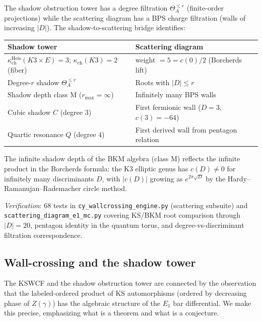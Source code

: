 \begin{remark}
\label{rem:k3e-degree-bps}
The shadow obstruction tower has a degree filtration $\Theta_A^{\leq r}$ (finite-order projections) while the scattering diagram has a BPS charge filtration (walls of increasing $|D|$). The shadow-to-scattering bridge identifies:
\begin{center}
\begin{tabular}{ll}
\textbf{Shadow tower} & \textbf{Scattering diagram} \\ \hline
$\kappa_{\mathrm{ch}}^{\mathrm{Heis}}(K3 \times E) = 3$; $\kappa_{\mathrm{ch}}(K3) = 2$ (fiber) & weight $= 5 = c(0)/2$ (Borcherds lift) \\
Degree-$r$ shadow $\Theta_A^{\leq r}$ & Roots with $|D| \leq r$ \\
Shadow depth class M ($r_{\max} = \infty$) & Infinitely many BPS walls \\
Cubic shadow $C$ (degree $3$) & First fermionic wall ($D = 3$, $c(3) = -64$) \\
Quartic resonance $Q$ (degree $4$) & First derived wall from pentagon relation
\end{tabular}
\end{center}
The infinite shadow depth of the BKM algebra (class M) reflects the infinite product in the Borcherds formula: the K3 elliptic genus has $c(D) \neq 0$ for infinitely many discriminants $D$, with $|c(D)|$ growing as $e^{2\pi\sqrt{D}}$ by the Hardy--Ramanujan--Rademacher circle method.
\end{remark}

\noindent\textit{Verification}: 68 tests in \texttt{cy\_wallcrossing\_engine.py} (scattering subsuite) and \texttt{scattering\_diagram\_e1\_mc.py} covering KS/BKM root comparison through $|D| = 20$, pentagon identity in the quantum torus, and degree-vs-discriminant filtration correspondence.


\subsection{Wall-crossing and the shadow tower}
\label{subsec:k3e-wall-crossing-shadow}

The KSWCF and the shadow obstruction tower are connected by the observation that the labeled-ordered product of KS automorphisms (ordered by decreasing phase of $Z(\gamma)$) has the algebraic structure of the $E_1$ bar differential. We make this precise, emphasizing what is a theorem and what is a conjecture.

